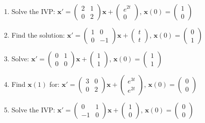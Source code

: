 \documentclass[12pt]{article}
\begin{document}
\begin{enumerate}[start=16]
\item Solve the IVP: $\mathbf{x}' = \begin{pmatrix} 2 & 1 \\ 0 & 2 \end{pmatrix}\mathbf{x} + \begin{pmatrix} e^{2t} \\ 0 \end{pmatrix}$, $\mathbf{x}(0) = \begin{pmatrix} 1 \\ 0 \end{pmatrix}$

\item Find the solution: $\mathbf{x}' = \begin{pmatrix} 1 & 0 \\ 0 & -1 \end{pmatrix}\mathbf{x} + \begin{pmatrix} t \\ t \end{pmatrix}$, $\mathbf{x}(0) = \begin{pmatrix} 0 \\ 1 \end{pmatrix}$

\item Solve: $\mathbf{x}' = \begin{pmatrix} 0 & 1 \\ 0 & 0 \end{pmatrix}\mathbf{x} + \begin{pmatrix} 1 \\ 1 \end{pmatrix}$, $\mathbf{x}(0) = \begin{pmatrix} 1 \\ 1 \end{pmatrix}$

\item Find $\mathbf{x}(1)$ for: $\mathbf{x}' = \begin{pmatrix} 3 & 0 \\ 0 & 2 \end{pmatrix}\mathbf{x} + \begin{pmatrix} e^{3t} \\ e^{2t} \end{pmatrix}$, $\mathbf{x}(0) = \begin{pmatrix} 0 \\ 0 \end{pmatrix}$

\item Solve the IVP: $\mathbf{x}' = \begin{pmatrix} 0 & 1 \\ -1 & 0 \end{pmatrix}\mathbf{x} + \begin{pmatrix} 1 \\ 0 \end{pmatrix}$, $\mathbf{x}(0) = \begin{pmatrix} 0 \\ 0 \end{pmatrix}$
\end{enumerate}
\end{document}
